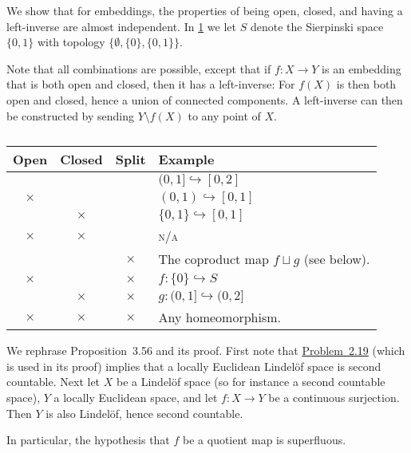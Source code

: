 \documentclass[article, a4paper, 11pt, oneside]{memoir}
\numberwithin{equation}{chapter}
\newcommand{\RNum}[1]{\uppercase\expandafter{\romannumeral #1\relax}}
\newcommand{\probref}[1]{%
    \hyperref[prob:#1]{Problem~#1}%
}
\theoremstyle{nonumberplain}
\renewcommand{\coprod}{\sqcup}
\begin{document}
\begin{remarkbreak}[Embeddings]
    We show that for embeddings, the properties of being open, closed, and having a left-inverse are almost independent. In \cref{tab:embeddings} we let $S$ denote the Sierpinski space $\{0,1\}$ with topology $\{\emptyset, \{0\}, \{0,1\}\}$.

    Note that all combinations are possible, except that if $f \colon X \to Y$ is an embedding that is both open and closed, then it has a left-inverse: For $f(X)$ is then both open and closed, hence a union of connected components. A left-inverse can then be constructed by sending $Y \setminus f(X)$ to any point of $X$.
\end{remarkbreak}

\begin{table}
    \newcommand{\x}{$\times$}
    \centering
    \begin{tabular}{cccp{7cm}}
        \toprule
        Open & Closed & Split & Example \\
        \midrule
        & & & $(0,1] \hookrightarrow [0,2]$ \\
        \x & & & $(0,1) \hookrightarrow [0,1]$ \\
        & \x & & $\{0,1\} \hookrightarrow [0,1]$ \\
        \x & \x & & \textsc{n/a} \\
        & & \x & The coproduct map $f \coprod g$ (see below). \\
        \x & & \x & $f \colon \{0\} \hookrightarrow S$ \\
        & \x & \x & $g \colon (0,1] \hookrightarrow (0,2]$ \\
        \x & \x & \x & Any homeomorphism. \\
        \bottomrule
    \end{tabular}
    \captiondelim{} %
    \caption{}
    \label{tab:embeddings}
\end{table}

\begin{remark}
    We rephrase Proposition~3.56 and its proof. First note that \probref{2.19} (which is used in its proof) implies that a locally Euclidean Lindelöf space is second countable. Next let $X$ be a Lindelöf space (so for instance a second countable space), $Y$ a locally Euclidean space, and let $f \colon X \to Y$ be a continuous surjection. Then $Y$ is also Lindelöf, hence second countable.

    In particular, the hypothesis that $f$ be a quotient map is superfluous.
\end{remark}
\end{document}
